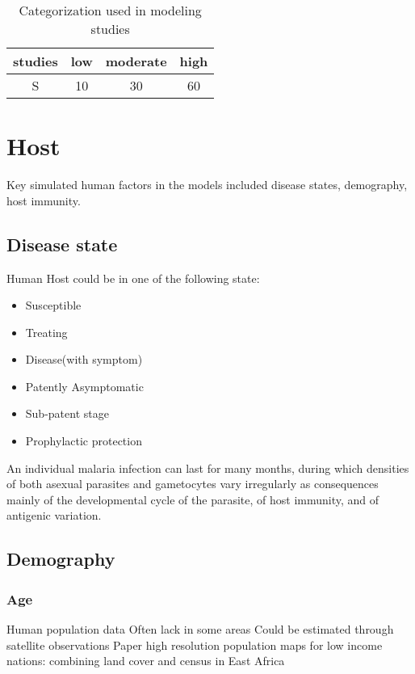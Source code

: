 \documentclass[a4paper, 12pt, twoside]{article}
\begin{document}
\begin{table}
  \centering
  \begin{tabular}{c S S S}
    \toprule
    studies & {low} & {moderate} & {high} \\
    \midrule
    S & 10 & 30 & 60 \\
    \bottomrule
  \end{tabular}
  \caption{Categorization used in modeling studies}
\end{table}

\section{Host}%
\label{sec:Host}

Key simulated human factors in the models included disease states, demography, host immunity.

\subsection{Disease state}

Human Host could be in one of the following state:
\begin{itemize}
	\item Susceptible
	\item Treating
	\item Disease(with symptom)
	\item Patently Asymptomatic
	\item Sub-patent stage
	\item Prophylactic protection
\end{itemize}

An individual malaria infection can last for many months, during which densities of both asexual parasites and gametocytes vary irregularly as consequences mainly of the developmental cycle of the parasite, of host immunity, and of antigenic variation.

\subsection{Demography}

  \subsubsection{Age}
Human population data
Often lack in some areas
Could be estimated through satellite observations
Paper high resolution population maps for low income nations: combining land cover and census in East Africa
\end{document}
